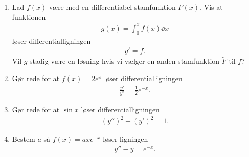 \begin{enumerate}
	
	
	\item Lad $f(x)$ være med en differentiabel stamfunktion $F(x)$. Vis at funktionen 
	\begin{align*}
	g(x)=\int_0^x f(x)\dd x
	\end{align*}
	løser differentialligningen 
	\begin{align*}
	y'=f.
	\end{align*}
	Vil $g$ stadig være en løsning hvis vi vælger en anden stamfunktion $\tilde{F}$ til $f$?
	
	\item Gør rede for at $f(x)=2e^x$ løser differentialligningen
	\begin{align*}
	\frac{y'}{y^2}=\frac{1}{2}e^{-x}.
	\end{align*}

	
	
	
	
	
	
	
		\item Gør rede for at $\sin x$ løser differentialligningen
		\begin{align*}
		(y'')^2+(y')^2=1.
		\end{align*}
	\item Bestem $a$ så $ f(x)=axe^{-x}$ løser ligningen
	\begin{align*}
	y''-y=e^{-x}.
	\end{align*}
	
\end{enumerate}